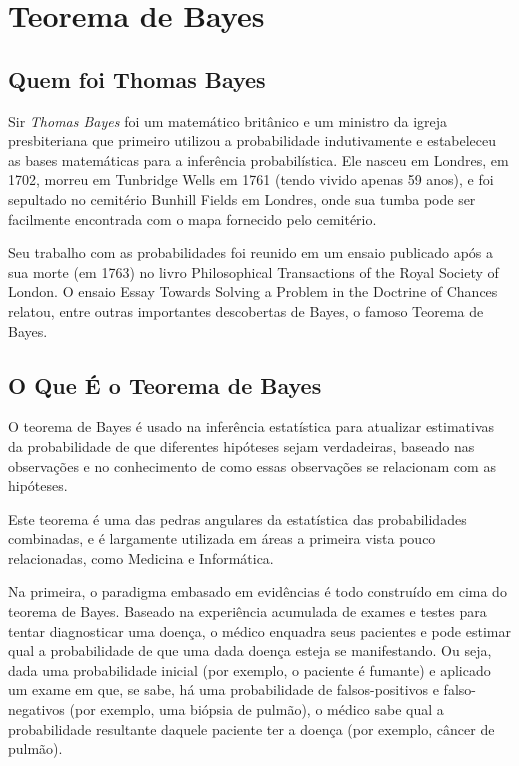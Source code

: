 \newpage
\section{Teorema de Bayes}
\subsection{Quem foi Thomas Bayes}

Sir \emph{Thomas Bayes} foi um matemático britânico e um ministro
da igreja presbiteriana que primeiro utilizou a probabilidade
indutivamente e estabeleceu as bases matemáticas para a inferência
probabilística. Ele nasceu em Londres, em 1702, morreu em
Tunbridge Wells em 1761 (tendo vivido apenas 59 anos), e foi
sepultado no cemitério Bunhill Fields em Londres, onde sua tumba
pode ser facilmente encontrada com o mapa fornecido pelo
cemitério.\vskip0.3cm

Seu trabalho com as probabilidades foi reunido em um ensaio
publicado após a sua morte (em 1763) no livro Philosophical
Transactions of the Royal Society of London. O ensaio Essay
Towards Solving a Problem in the Doctrine of Chances relatou,
entre outras importantes descobertas de Bayes, o famoso Teorema de
Bayes.

\subsection{ O Que É o Teorema de Bayes}

O teorema de Bayes é usado na inferência estatística para
atualizar estimativas da probabilidade de que diferentes hipóteses
sejam verdadeiras, baseado nas observações e no conhecimento de
como essas observações se relacionam com as hipóteses.\vskip0.3cm

Este teorema é uma das pedras angulares da estatística das
probabilidades combinadas, e é largamente utilizada em áreas a
primeira vista pouco relacionadas, como Medicina e
Informática.\vskip0.3cm

Na primeira, o paradigma embasado em evidências é todo construído
em cima do teorema de Bayes. Baseado na experiência acumulada de
exames e testes para tentar diagnosticar uma doença, o médico
enquadra seus pacientes e pode estimar qual a probabilidade de que
uma dada doença esteja se manifestando. Ou seja, dada uma
probabilidade inicial (por exemplo, o paciente é fumante) e
aplicado um exame em que, se sabe, há uma probabilidade de
falsos-positivos e falso-negativos (por exemplo, uma biópsia de
pulmão), o médico sabe qual a probabilidade resultante daquele
paciente ter a doença (por exemplo, câncer de pulmão).\vskip0.3cm

